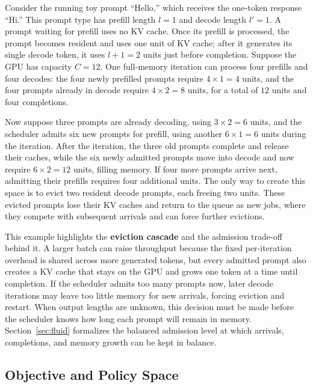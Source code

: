 \begin{example}
\label{ex:memory_growth}
Consider the running toy prompt ``Hello,'' which receives the one-token response ``Hi.'' This prompt type has prefill length \(l=1\) and decode length \(l'=1\). A prompt waiting for prefill uses no KV cache. Once its prefill is processed, the prompt becomes resident and uses one unit of KV cache; after it generates its single decode token, it uses \(l+1=2\) units just before completion. Suppose the GPU has capacity \(C=12\). One full-memory iteration can process four prefills and four decodes: the four newly prefilled prompts require \(4\times1=4\) units, and the four prompts already in decode require \(4\times2=8\) units, for a total of \(12\) units and four completions.

Now suppose three prompts are already decoding, using \(3\times2=6\) units, and the scheduler admits six new prompts for prefill, using another \(6\times1=6\) units during the iteration. After the iteration, the three old prompts complete and release their caches, while the six newly admitted prompts move into decode and now require \(6\times2=12\) units, filling memory. If four more prompts arrive next, admitting their prefills requires four additional units. The only way to create this space is to evict two resident decode prompts, each freeing two units. These evicted prompts lose their KV caches and return to the queue as new jobs, where they compete with subsequent arrivals and can force further evictions.

This example highlights the \textbf{eviction cascade} and the admission trade-off behind it. A larger batch can raise throughput because the fixed per-iteration overhead is shared across more generated tokens, but every admitted prompt also creates a KV cache that stays on the GPU and grows one token at a time until completion. If the scheduler admits too many prompts now, later decode iterations may leave too little memory for new arrivals, forcing eviction and restart. When output lengths are unknown, this decision must be made before the scheduler knows how long each prompt will remain in memory. Section~\ref{sec:fluid} formalizes the balanced admission level at which arrivals, completions, and memory growth can be kept in balance.
\end{example}

\subsection{Objective and Policy Space}

